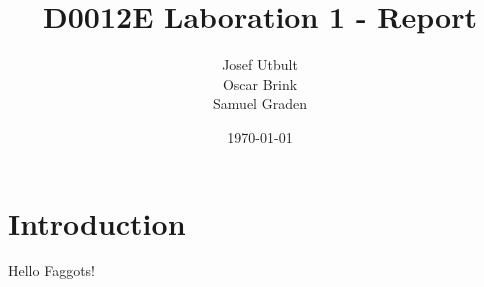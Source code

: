 \documentclass{article}
\title{D0012E Laboration 1 - Report}
\author{Josef Utbult \\ Oscar Brink \\ Samuel Graden}
\date{\today}
\begin{document}
\maketitle

\section{Introduction}

	Hello Faggots!	
\end{document}
